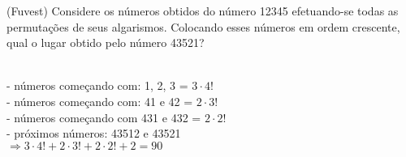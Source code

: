 \begin{ex}
 (Fuvest) Considere os números obtidos do número 12345 efetuando-se todas as permutações de seus algarismos. Colocando esses números em ordem crescente, qual o lugar obtido pelo número 43521?
   \begin{sol}
   \phantom{A}  \\
   - números começando com: 1, 2, 3 = $ 3\cdot4!$ \\
   - números começando com: 41 e 42 =  $ 2\cdot3!$  \\
   - números começando com 431 e 432 = $ 2\cdot2!$ \\
   - próximos números: 43512 e 43521 \\
   $ \Longrightarrow 3\cdot4!+2\cdot3!+2\cdot2!+2=90$
   \end{sol}
\end{ex}